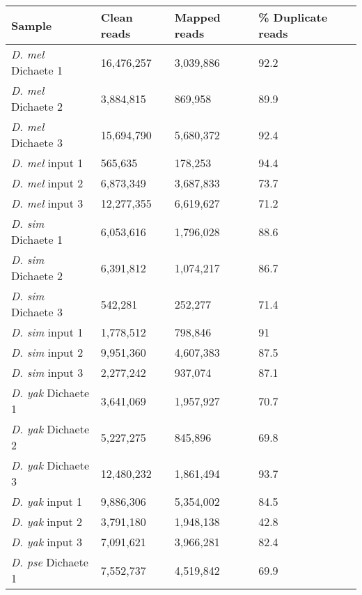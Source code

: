 \begin{table}[h]
\centering
\begin{tabular}{|l|l|l|l|}
\hline
\textbf{Sample}            & \textbf{Clean reads} & \textbf{Mapped reads} & \textbf{\% Duplicate reads} \\ \hline
\emph{D. mel} Dichaete 1 & 16,476,257  & 3,039,886    & 92.2               \\ \hline
\emph{D. mel} Dichaete 2 & 3,884,815   & 869,958      & 89.9               \\ \hline
\emph{D. mel} Dichaete 3 & 15,694,790  & 5,680,372    & 92.4               \\ \hline
\emph{D. mel} input 1    & 565,635     & 178,253      & 94.4               \\ \hline
\emph{D. mel} input 2    & 6,873,349   & 3,687,833    & 73.7               \\ \hline
\emph{D. mel} input 3    & 12,277,355  & 6,619,627    & 71.2               \\ \hline
\emph{D. sim} Dichaete 1 & 6,053,616   & 1,796,028    & 88.6               \\ \hline
\emph{D. sim} Dichaete 2 & 6,391,812   & 1,074,217    & 86.7               \\ \hline
\emph{D. sim} Dichaete 3 & 542,281     & 252,277      & 71.4               \\ \hline
\emph{D. sim} input 1    & 1,778,512   & 798,846      & 91                 \\ \hline
\emph{D. sim} input 2    & 9,951,360   & 4,607,383    & 87.5               \\ \hline
\emph{D. sim} input 3    & 2,277,242   & 937,074      & 87.1               \\ \hline
\emph{D. yak} Dichaete 1 & 3,641,069   & 1,957,927    & 70.7               \\ \hline
\emph{D. yak} Dichaete 2 & 5,227,275   & 845,896      & 69.8               \\ \hline
\emph{D. yak} Dichaete 3 & 12,480,232  & 1,861,494    & 93.7               \\ \hline
\emph{D. yak} input 1    & 9,886,306   & 5,354,002    & 84.5               \\ \hline
\emph{D. yak} input 2    & 3,791,180   & 1,948,138    & 42.8               \\ \hline
\emph{D. yak} input 3    & 7,091,621   & 3,966,281    & 82.4               \\ \hline
\emph{D. pse} Dichaete 1 & 7,552,737   & 4,519,842    & 69.9               \\ \hline

\end{tabular}
\end{table}
